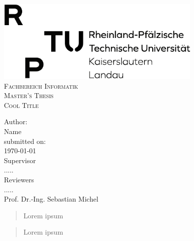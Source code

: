 \documentclass[a4paper]{report}
\author{}
\date{\today}
\begin{document}
\pagestyle{empty}
\begin{titlepage}
\begin{center}
	\includegraphics[width=10cm,clip,trim=0 0 0 0\textwidth]{rptu}\\[2cm]
  \textsc{\large Fachbereich Informatik}\\[1.5cm]
	\vfill
  \textsc{\Large Master's Thesis}\\[0.5cm]
{
  \linespread{1.0}\selectfont
{\LARGE   \textsc{Cool Title}\\[2cm]}
}

  { \Large
  Author:\\
	Name\\[2cm]
  {\small submitted on: \\
  \today}
  }\\[1cm]

  Supervisor\\
.....\\[2cm]
  Reviewers\\
.....\\
  Prof. Dr.-Ing. Sebastian Michel\\

  
\end{center}
\end{titlepage}

%
\cleardoublepage


\begin{abstract}
Lorem ipsum
\end{abstract}

\cleardoublepage

\begin{abstract}
Lorem ipsum
\end{abstract}

\tableofcontents
\thispagestyle{empty}
\listoffigures
\thispagestyle{empty}
\begingroup
\thispagestyle{empty}
\let\clearpage\relax
\vspace{3cm}
\listofalgorithms
\let\clearpage\relax
\vspace{3cm}
\listoftables
\endgroup
\thispagestyle{empty}
\end{document}
